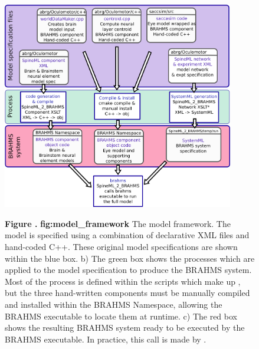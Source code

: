 \documentclass{frontiersSCNS}
\begin{document}
\begin{figure}[htb!]
\begin{center}
\includegraphics[width=0.9\textwidth]{./figures/model_framework.png}
\end{center}
\textbf{\label{fig:model_framework} Figure .}
{ \textbf{fig:model\_framework} The model framework. The model is specified using a combination of
declarative XML files and hand-coded C++. These original model
specifications are shown within the blue box. b) The green box shows
the processes which are applied to the model specification to produce
the BRAHMS system. Most of the process is defined within the scripts
which make up \stob, but the three hand-written components must be
manually compiled and installed within the BRAHMS Namespace, allowing
the BRAHMS executable to locate them at runtime. c) The red box shows
the resulting BRAHMS system ready to be executed by the BRAHMS
executable. In practice, this call is made by \stob.}
\end{figure}
\end{document}
